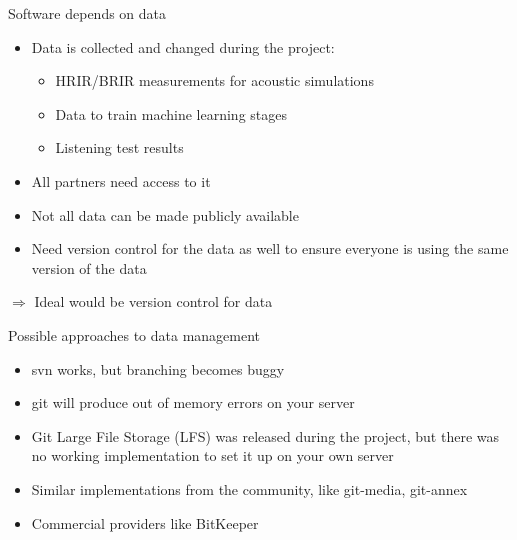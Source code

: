 \documentclass{beamer}
\begin{document}
\begin{frame}{Software depends on data}

    \begin{itemize}
        \item Data is collected and changed during the project:
            \begin{itemize}
                \item HRIR/BRIR measurements for acoustic simulations
                \item Data to train machine learning stages
                \item Listening test results
            \end{itemize}
        \item All partners need access to it
        \item Not all data can be made publicly available
        \item Need version control for the data as well to ensure everyone is
            using the same version of the data
    \end{itemize}

    \vspace{0.5cm}

    $\Rightarrow$ Ideal would be version control for data

\end{frame}

\begin{frame}{Possible approaches to data management}

    \begin{itemize}
        \item svn works, but branching becomes buggy
        \item git will produce out of memory errors on your server
        \item Git Large File Storage (LFS) was released during the project, but
            there was no working implementation to set it up on your own server
        \item Similar implementations from the community, like
            git-media, git-annex
        \item Commercial providers like BitKeeper
    \end{itemize}

\end{frame}
\end{document}
